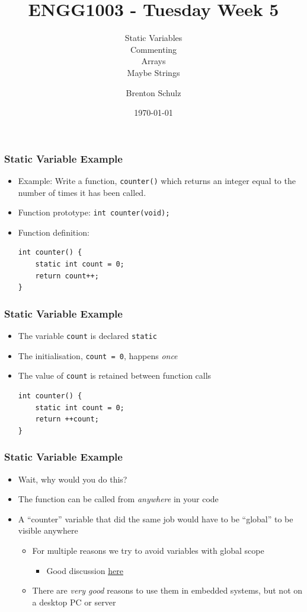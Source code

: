 \documentclass[14pt]{beamer}
\title{ENGG1003 - Tuesday Week 5}
\subtitle{Static Variables\\Commenting\\Arrays\\Maybe Strings}
\author{Brenton Schulz}
\institute{University of Newcastle}
\date{\today}
\begin{document}
\titlepage

\begin{frame}[fragile]
\frametitle{Static Variable Example}
\begin{itemize}
\item Example: Write a function, \texttt{counter()} which returns an integer equal to the number of times it has been called.
\pause
\item Function prototype: \texttt{int counter(void);}
\pause
\item Function definition:
\begin{lstlisting}[style=CStyle]
int counter() {
	static int count = 0;
	return count++;
}
\end{lstlisting}
\end{itemize}
\end{frame}

\begin{frame}[fragile]
\frametitle{Static Variable Example}
\begin{itemize}
\item The variable \texttt{count} is declared \texttt{static}
\item The initialisation, \texttt{count = 0}, happens \textit{once}
\item The value of \texttt{count} is retained between function calls 
\begin{lstlisting}[style=CStyle]
int counter() {
	static int count = 0;
	return ++count;
}
\end{lstlisting}
\end{itemize}
\end{frame}

\begin{frame}
\frametitle{Static Variable Example}
\begin{itemize}
\item Wait, why would you do this?
\pause
\item The function can be called from \textit{anywhere} in your code
\pause
\item A ``counter'' variable that did the same job would have to be ``global'' to be visible anywhere
	\begin{itemize}
\pause
		\item For multiple reasons we try to avoid variables with global scope
			\begin{itemize}
				\item Good discussion \underline{\href{http://wiki.c2.com/?GlobalVariablesAreBad}{here}}
			\end{itemize}
\pause
		\item There are \textit{very good} reasons to use them in embedded systems, but not on a desktop PC or server
	\end{itemize}
\end{itemize}
\end{frame}
\end{document}
